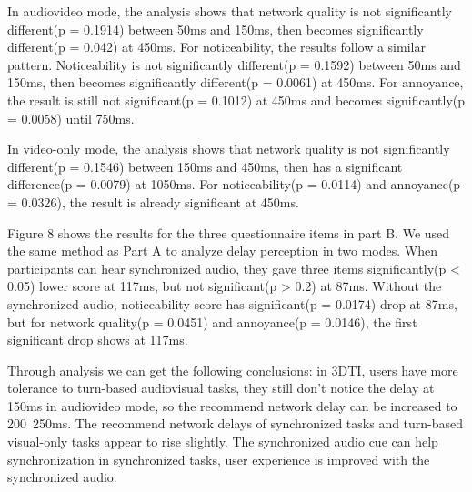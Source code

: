 In audiovideo mode, the analysis shows that network quality is not significantly different(p = 0.1914) between 50ms and 150ms, then becomes significantly different(p = 0.042) at 450ms. For noticeability, the results follow a similar pattern. Noticeability is not significantly different(p = 0.1592) between 50ms and 150ms, then becomes significantly different(p = 0.0061) at 450ms. For annoyance, the result is still not significant(p = 0.1012) at 450ms and becomes significantly(p = 0.0058) until 750ms.

In video-only mode, the analysis shows that network quality is not significantly different(p = 0.1546) between 150ms and 450ms, then has a significant difference(p = 0.0079) at 1050ms. For noticeability(p = 0.0114) and annoyance(p = 0.0326), the result is already significant at 450ms.



Figure 8 shows the results for the three questionnaire items in part B. We used the same method as Part A to analyze delay perception in two modes.
When participants can hear synchronized audio, they gave three items significantly(p < 0.05) lower score at 117ms, but not significant(p > 0.2) at 87ms. Without the synchronized audio, noticeability score has significant(p = 0.0174) drop at 87ms, but for network quality(p = 0.0451) and annoyance(p = 0.0146), the first significant drop shows at 117ms.

Through analysis we can get the following conclusions: in 3DTI, users have more tolerance to turn-based audiovisual tasks, they still don't notice the delay at 150ms in audiovideo mode, so the recommend network delay can be increased to 200~250ms. The recommend network delays of synchronized tasks and turn-based visual-only tasks appear to rise slightly. The synchronized audio cue can help synchronization in synchronized tasks, user experience is improved with the synchronized audio.

\fi
